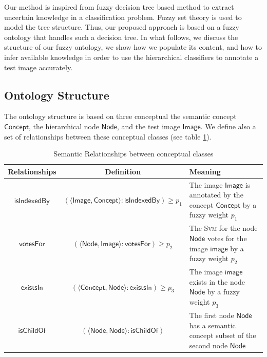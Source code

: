 	Our method is inspired from fuzzy decision tree based method \citep{Wang2015,Bujnowski2015} 
	to extract uncertain knowledge in a classification problem. Fuzzy set theory is used to model
	the tree structure. Thus, our proposed approach is based on a fuzzy ontology that handles such 
	a decision tree. In what follows, we discuss the structure of our fuzzy ontology, we show how 
	we populate its content, and how to infer available knowledge in order to use the hierarchical 
	classifiers to annotate a test image accurately.

	\subsection{Ontology Structure}
		The ontology structure is based on three conceptual  the semantic 
		concept $\mathsf{Concept}$, the hierarchical node $\mathsf{Node}$, and the test image $\mathsf{Image}$.
		We define also a set of relationships between these conceptual classes (see table \ref{tab1}).
		\begin{table}[ht!]
			\centering
			\caption{Semantic Relationships between conceptual classes}
			\begin{tabular}{ c c p{5cm}  }
			\hline
			\textbf{\small Relationships} 	& \textbf{\small Definition}	&\textbf{\small Meaning} \\
			\hline \hline
			
			$\mathsf{isIndexedBy}$	& 
			$(\langle{}\mathsf{Image},\mathsf{Concept}\rangle:\mathsf{isIndexedBy}) \geq p_{1}$ 
			& The image $\mathsf{Image}$ is annotated by the concept $\mathsf{Concept}$ by a fuzzy weight $p_{1}$  \\
			\hline
			
			$\mathsf{votesFor}$		& 
			$(\langle{}\mathsf{Node},\mathsf{Image}\rangle:\mathsf{votesFor}) \geq p_{2}$ 
			& The \textsc{Svm} for the node $\mathsf{Node}$ votes for the image $\mathsf{image}$ by a fuzzy weight $p_{2}$  \\
			\hline
	
			$\mathsf{existsIn}$		& 
			$(\langle{}\mathsf{Concept},\mathsf{Node}\rangle:\mathsf{existsIn}) \geq p_{3}$ 
			& The image $\mathsf{image}$ exists in the node $\mathsf{Node}$ by a fuzzy weight $p_{3}$  \\
			\hline
	
			$\mathsf{isChildOf}$	& 
			$(\langle{}\mathsf{Node},\mathsf{Node}\rangle:\mathsf{isChildOf})$ 
			& The first node $\mathsf{Node}$ has a semantic concept subset of the second node 
			$\mathsf{Node}$ \\
			\hline
		\end{tabular}
		\label{tab1}
	\end{table}


